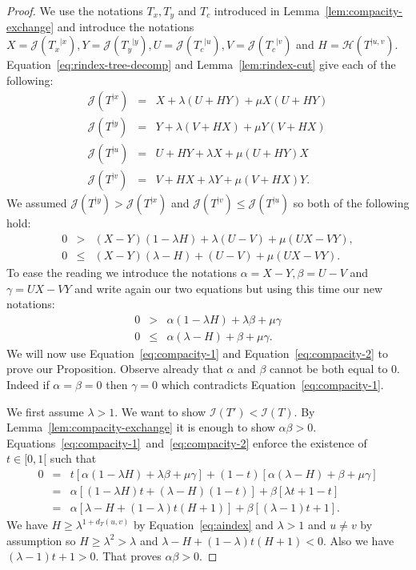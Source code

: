 \documentclass[11 pt]{modarticle}
\newcommand{\distance}[3]{d_{#3}(#1,#2)}
\newcommand{\rtree}[2]{{#1}^{\lvert #2}}
\newcommand{\indexsymbol}{\mathcal{I}}
\newcommand{\tindex}[1]{\indexsymbol(#1)}
\newcommand{\rindexsymbol}{\mathcal{J}}
\newcommand{\rindex}[2]{\rindexsymbol(\rtree{#2}{#1})}
\newcommand{\aindexsymbol}{\mathcal{H}}
\newcommand{\aindex}[3]{\aindexsymbol(\rtree{#3}{#1, #2})}
\begin{document}
\begin{proof}
We use the notations $T_x, T_y$ and $T_c$ introduced in Lemma~\ref{lem:compacity-exchange} and introduce the notations $X = \rindex{x}{T_x}, Y = \rindex{y}{T_y}, U = \rindex{u}{T_c}, V = \rindex{v}{T_c}$ and $H = \aindex{u}{v}{T}$. Equation~\eqref{eq:rindex-tree-decomp} and Lemma~\ref{lem:rindex-cut} give each of the following:
\begin{eqnarray*}
	\rindex{x}{T} & = & X + \lambda (U + HY) + \mu X (U + HY) \\
	\rindex{y}{T} & = & Y + \lambda (V + HX) + \mu Y (V + HX) \\
	\rindex{u}{T} & = & U + HY + \lambda X + \mu (U + HY) X \\
	\rindex{v}{T} & = & V + HX + \lambda Y + \mu (V + HX) Y.
\end{eqnarray*}
We assumed $\rindex{y}{T} > \rindex{x}{T}$ and $\rindex{v}{T} \leq \rindex{u}{T}$ so both of the following hold:
\begin{eqnarray*}
	0 & > & (X - Y)(1 - \lambda H) + \lambda (U - V) + \mu (UX - VY), \\
	0 & \leq & (X - Y)(\lambda - H) + (U - V) + \mu (UX - VY).
\end{eqnarray*}
To ease the reading we introduce the notations $\alpha = X - Y, \beta = U - V$ and $\gamma = UX - VY$ and write again our two equations but using this time our new notations:
\begin{eqnarray}
	0 & > & \alpha (1 - \lambda H) + \lambda \beta + \mu \gamma \label{eq:compacity-1} \\
	0 & \leq & \alpha(\lambda - H) + \beta + \mu \gamma. \label{eq:compacity-2}
\end{eqnarray}
We will now use Equation~\eqref{eq:compacity-1} and Equation~\eqref{eq:compacity-2} to prove our Proposition. Observe already that $\alpha$ and $\beta$ cannot be both equal to $0$. Indeed if $\alpha = \beta = 0$ then $\gamma = 0$ which contradicts Equation~\eqref{eq:compacity-1}.


We first assume $\lambda > 1$. We want to show $\tindex{T'} < \tindex{T}$. By Lemma~\ref{lem:compacity-exchange} it is enough to show $\alpha \beta > 0$.  Equations~\eqref{eq:compacity-1}~and~\eqref{eq:compacity-2} enforce the existence of $t \in [0,1[$ such that
\begin{eqnarray*}
	0 & = & t [\alpha (1 - \lambda H) + \lambda \beta + \mu \gamma] + (1 - t) [\alpha(\lambda - H) + \beta + \mu \gamma] \\
	& = & \alpha [(1 - \lambda H)t + (\lambda - H)(1 - t)] + \beta [\lambda t + 1 - t] \\
	& = & \alpha [\lambda - H + (1 - \lambda)t(H+1)] + \beta [(\lambda - 1) t + 1].
\end{eqnarray*}
We have $H \geq \lambda^{1 + \distance{u}{v}{T}}$ by Equation~\eqref{eq:aindex} and $\lambda > 1$ and $u \neq v$ by assumption so $H \geq \lambda^2 > \lambda$ and $\lambda - H + (1 - \lambda)t(H+1) < 0$.  Also we have $(\lambda - 1) t + 1 > 0$. That proves $\alpha \beta > 0$.


\end{proof}
\end{document}

